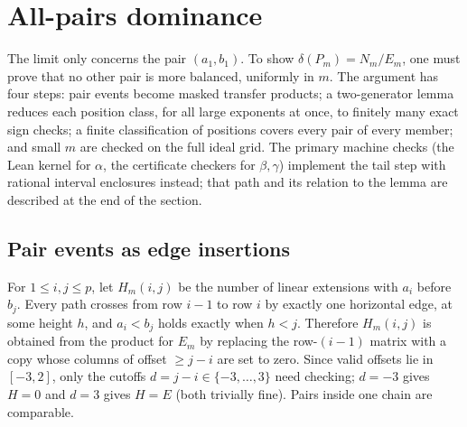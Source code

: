 \documentclass[11pt]{amsart}
\theoremstyle{definition}
\theoremstyle{remark}
\begin{document}
\section{All-pairs dominance}\label{sec:dominance}

The limit only concerns the pair $(a_1,b_1)$. To show $\delta(P_m)=N_m/E_m$, one must prove that no other pair is more balanced, uniformly in $m$. The argument has four steps: pair events become masked transfer products; a two-generator lemma reduces each position class, for all large exponents at once, to finitely many exact sign checks; a finite classification of positions covers every pair of every member; and small $m$ are checked on the full ideal grid. The primary machine checks (the Lean kernel for $\alpha$, the certificate checkers for $\beta,\gamma$) implement the tail step with rational interval enclosures instead; that path and its relation to the lemma are described at the end of the section.

\subsection*{Pair events as edge insertions}
For $1\le i,j\le p$, let $H_m(i,j)$ be the number of linear extensions with $a_i$ before $b_j$. Every path crosses from row $i-1$ to row $i$ by exactly one horizontal edge, at some height $h$, and $a_i<b_j$ holds exactly when $h<j$. Therefore $H_m(i,j)$ is obtained from the product for $E_m$ by replacing the row-$(i-1)$ matrix with a copy whose columns of offset $\ge j-i$ are set to zero. Since valid offsets lie in $[-3,2]$, only the cutoffs $d=j-i\in\{-3,\dots,3\}$ need checking; $d=-3$ gives $H=0$ and $d=3$ gives $H=E$ (both trivially fine). Pairs inside one chain are comparable.
\end{document}
